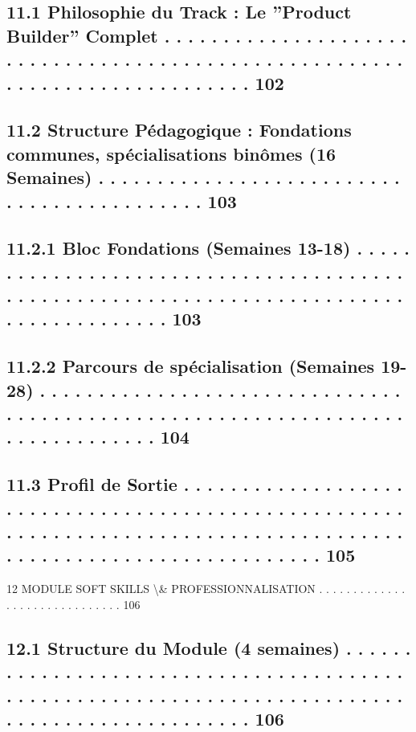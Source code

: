 \subsection{11.1    Philosophie du Track : Le ”Product Builder” Complet . . . . . . . . . . . . . . . . . . . . . . . . . . . . . . . . . . . . . . . . . . . . . . . . . . . . . . . . . . . . . . . . . . . . . . . . . . . . 102}
\subsection{11.2    Structure Pédagogique : Fondations communes, spécialisations binômes (16 Semaines) . . . . . . . . . . . . . . . . . . . . . . . . . . . . . . . . . . . . . . . . . . . 103}
\subsection{11.2.1              Bloc Fondations (Semaines 13-18) . . . . . . . . . . . . . . . . . . . . . . . . . . . . . . . . . . . . . . . . . . . . . . . . . . . . . . . . . . . . . . . . . . . . . . . . . . . . . . . . . . . . . . . 103}
\subsection{11.2.2              Parcours de spécialisation (Semaines 19-28) . . . . . . . . . . . . . . . . . . . . . . . . . . . . . . . . . . . . . . . . . . . . . . . . . . . . . . . . . . . . . . . . . . . . . . . . . . . . . . 104}
\subsection{11.3    Profil de Sortie . . . . . . . . . . . . . . . . . . . . . . . . . . . . . . . . . . . . . . . . . . . . . . . . . . . . . . . . . . . . . . . . . . . . . . . . . . . . . . . . . . . . . . . . . . . . . . . . . . . . . . . . . . . . . . . . . . 105}
\vspace{0.5em}
12    MODULE SOFT SKILLS \textbackslash{}& PROFESSIONNALISATION . . . . . . . . . . . . . . . . . . . . . . . . . . . . . . 106\\
\subsection{12.1    Structure du Module (4 semaines) . . . . . . . . . . . . . . . . . . . . . . . . . . . . . . . . . . . . . . . . . . . . . . . . . . . . . . . . . . . . . . . . . . . . . . . . . . . . . . . . . . . . . . . . . . . . . . . 106}
